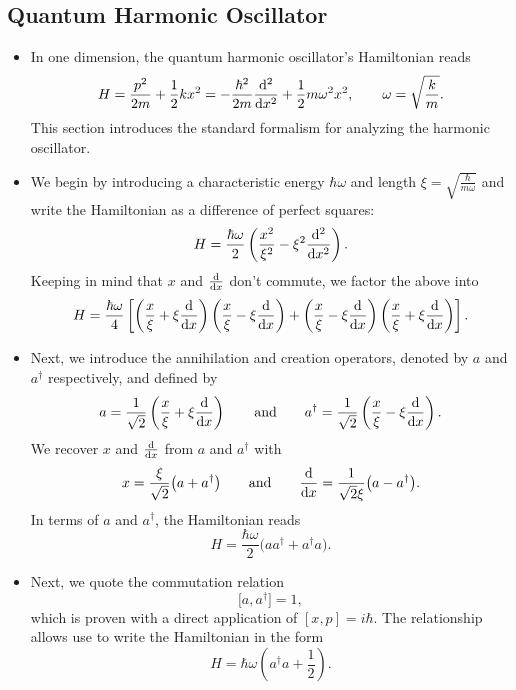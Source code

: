 \documentclass[11pt, a4paper]{article}
\newcommand{\eqtext}[1]{\qquad \text{#1} \qquad}
\newcommand{\Ham}{Hamiltonian\xspace}
\begin{document}
\subsection{Quantum Harmonic Oscillator}
\begin{itemize}
	\item In one dimension, the quantum harmonic oscillator's Hamiltonian reads
	\begin{equation*}
		H = \frac{p^{2}}{2m} + \frac{1}{2}kx^{2} = - \frac{\hbar^{2}}{2m}\dv[2]{}{x} + \frac{1}{2}m \omega^{2}x^{2}, \qquad \omega = \sqrt{\frac{k}{m}}.
	\end{equation*}
	This section introduces the standard formalism for analyzing the harmonic oscillator.
	
	\item We begin by introducing a characteristic energy $ \hbar \omega $ and length $ \xi = \sqrt{\frac{\hbar}{m\omega}}$  and write the Hamiltonian as a difference of perfect squares:
	\begin{equation*}
		H = \frac{\hbar \omega}{2}\left(\frac{x^{2}}{\xi^{2}} - \xi^{2} \dv[2]{}{x}\right).
	\end{equation*}
	Keeping in mind that $ x $ and $ \dv{x} $ don't commute, we factor the above into
	\begin{equation*}
		H = \frac{\hbar \omega}{4}\left[\left(\frac{x}{\xi} + \xi \dv{x}\right)\left(\frac{x}{\xi} - \xi \dv{x}\right) + \left(\frac{x}{\xi} - \xi \dv{x}\right)\left(\frac{x}{\xi} + \xi \dv{x}\right)\right].
	\end{equation*}
	
	\item Next, we introduce the annihilation and creation operators, denoted by $ a $  and $ a^{\dagger} $ respectively, and defined by
	\begin{equation*}
		a = \frac{1}{\sqrt{2}}\left(\frac{x}{\xi} + \xi \dv{x}\right) \eqtext{and} a^{\dagger} = \frac{1}{\sqrt{2}}\left(\frac{x}{\xi} - \xi \dv{x}\right). 
	\end{equation*} 
	We recover $ x $ and $ \dv{x} $ from $ a $ and $ a^{\dagger} $ with
	\begin{equation*}
		x = \frac{\xi}{\sqrt{2}}\big(a + a^{\dagger}\big) \eqtext{and} \dv{x} = \frac{1}{\sqrt{2}\xi}\big(a - a^{\dagger}\big). 
	\end{equation*}
    In terms of $ a $ and $ a^{\dagger} $, the \Ham reads
	\begin{equation*}
		H = \frac{\hbar\omega}{2}\big(a a^{\dagger} + a^{\dagger}a\big).
	\end{equation*}
	
	\item Next, we quote the commutation relation
	\begin{equation*}
		\big[a, a^{\dagger}\big] = 1,
	\end{equation*}
	which is proven with a direct application of $ [x, p] = i \hbar $. The relationship allows use to write the Hamiltonian in the form
	\begin{equation*}
		H = \hbar \omega \left(a^{\dagger}a + \frac{1}{2}\right).
	\end{equation*}
	
\end{itemize}
\end{document}
